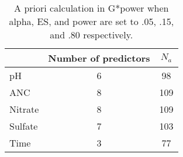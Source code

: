 \begin{table}[htbp]
		\caption{A priori calculation in G*power when alpha, ES, and power are set to .05, .15, and .80 respectively.}
		\begin{center}
		\begin{tabular}{lcc}
		\hline\noalign{\smallskip}
		 & \multicolumn{1}{l}{Number of predictors} & $N_a$ \\  \hline\noalign{\smallskip}
		pH & 6 & 98 \\ 
		ANC & 8 & 109 \\ 
		Nitrate & 8 & 109 \\ 
		Sulfate & 7 & 103 \\ 
		Time & 3 & 77 \\  \hline
		\end{tabular}
		\end{center}
		\label{tab:APN}
		\end{table}